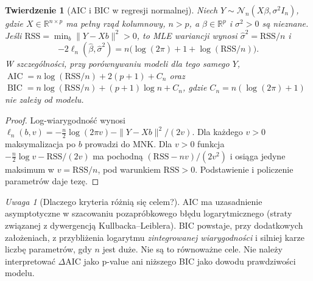 \documentclass[11pt,a4paper,oneside]{report}
\numberwithin{equation}{chapter}
\theoremstyle{plain}
\newtheorem{twierdzenie}{Twierdzenie}[chapter]
\theoremstyle{definition}
\theoremstyle{remark}
\newtheorem{uwaga}{Uwaga}[chapter]
\newcommand{\R}{\mathbb R}
\begin{document}
\begin{twierdzenie}[AIC i BIC w regresji normalnej]
\label{thm:aic-gaussian}
Niech $Y\sim\mathcal N_n(X\beta,\sigma^2I_n)$, gdzie
$X\in\R^{n\times p}$ ma pełny rząd kolumnowy, $n>p$,
a $\beta\in\R^p$ i $\sigma^2>0$ są nieznane.
Jeśli $\mathrm{RSS}=\min_b\|Y-Xb\|^2>0$, to MLE wariancji
wynosi $\widehat\sigma^2=\mathrm{RSS}/n$ i
\[
 -2\ell_n(\widehat\beta,\widehat\sigma^2)
 =n\bigl(\log(2\pi)+1+\log(\mathrm{RSS}/n)\bigr).
\]
W szczególności, przy porównywaniu modeli dla tego samego $Y$,
$\operatorname{AIC}=n\log(\mathrm{RSS}/n)+2(p+1)+C_n$ oraz
$\operatorname{BIC}=n\log(\mathrm{RSS}/n)+(p+1)\log n+C_n$,
gdzie $C_n=n(\log(2\pi)+1)$ nie zależy od modelu.
\end{twierdzenie}
\begin{proof}
Log-wiarygodność wynosi
$\ell_n(b,v)=-\tfrac n2\log(2\pi v)-\|Y-Xb\|^2/(2v)$.
Dla każdego $v>0$ maksymalizacja po $b$ prowadzi do MNK.
Dla $v>0$ funkcja $-\tfrac n2\log v-\mathrm{RSS}/(2v)$
ma pochodną $(\mathrm{RSS}-nv)/(2v^2)$ i osiąga
jedyne maksimum w $v=\mathrm{RSS}/n$, pod warunkiem
$\mathrm{RSS}>0$. Podstawienie i policzenie parametrów daje tezę.
\end{proof}

\begin{uwaga}[Dlaczego kryteria różnią się celem?]
AIC ma uzasadnienie asymptotyczne w szacowaniu pozapróbkowego
błędu logarytmicznego (straty związanej z dywergencją
Kullbacka--Leiblera). BIC powstaje, przy dodatkowych
założeniach, z przybliżenia logarytmu \emph{zintegrowanej
wiarygodności} i silniej karze liczbę parametrów, gdy $n$
jest duże. Nie są to równoważne cele. Nie należy
interpretować $\Delta\mathrm{AIC}$ jako p-value ani niższego BIC
jako dowodu prawdziwości modelu.
\end{uwaga}
\end{document}
